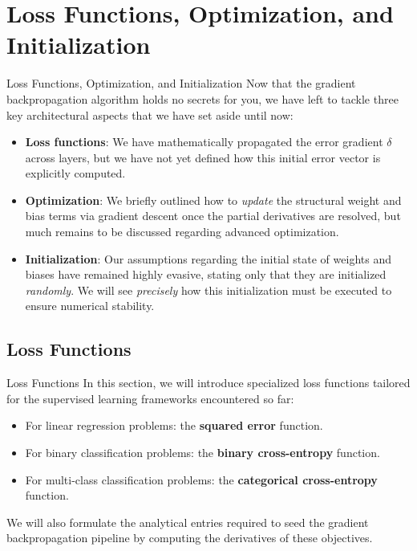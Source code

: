 \section[Loss Functions, Optimization, and Initialization]{Loss Functions, Optimization, and Initialization}

\begin{frame}{Loss Functions, Optimization, and Initialization}
	Now that the gradient backpropagation algorithm holds no secrets for you, we have left to tackle three key architectural aspects that we have set aside until now:
	
	\begin{itemize}
		\item \textbf{Loss functions}: We have mathematically propagated the error gradient $\delta$ across layers, but we have not yet defined how this initial error vector is explicitly computed.
		\pause
		\item \textbf{Optimization}: We briefly outlined how to \textit{update} the structural weight and bias terms via gradient descent once the partial derivatives are resolved, but much remains to be discussed regarding advanced optimization.
		\pause
		\item \textbf{Initialization}: Our assumptions regarding the initial state of weights and biases have remained highly evasive, stating only that they are initialized \textit{randomly}. We will see \textit{precisely} how this initialization must be executed to ensure numerical stability.
	\end{itemize}
\end{frame}

\subsection[Loss Functions]{Loss Functions}

\begin{frame}{Loss Functions}
	In this section, we will introduce specialized loss functions tailored for the supervised learning frameworks encountered so far:
	\begin{itemize}
		\item For linear regression problems: the \textbf{squared error} function.
		\item For binary classification problems: the \textbf{binary cross-entropy} function.
		\item For multi-class classification problems: the \textbf{categorical cross-entropy} function.
	\end{itemize}
	We will also formulate the analytical entries required to seed the gradient backpropagation pipeline by computing the derivatives of these objectives.
\end{frame}

